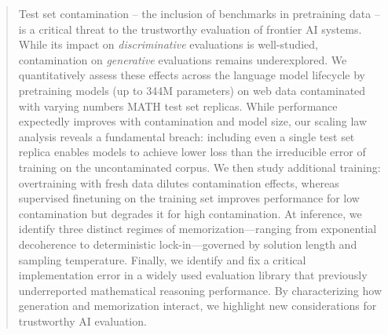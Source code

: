 \documentclass{article}
\theoremstyle{plain}
\theoremstyle{definition}
\theoremstyle{remark}
\begin{document}
\newcommand{\stella}[1]{%
  \textcolor{blue}{[\textbf{Stella:} #1] }}



\printAffiliationsAndNotice{}  %

\begin{abstract}
    Test set contamination -- the inclusion of benchmarks in pretraining data -- is a critical threat to the trustworthy evaluation of frontier AI systems.
    While its impact on \emph{discriminative} evaluations is well-studied, contamination on \emph{generative} evaluations remains underexplored.
    We quantitatively assess these effects across the language model lifecycle by pretraining models (up to 344M parameters) on web data contaminated with varying numbers MATH test set replicas.
    While performance expectedly improves with contamination and model size, our scaling law analysis reveals a fundamental breach: including even a single test set replica enables models to achieve lower loss than the irreducible error of training on the uncontaminated corpus.
    We then study additional training: overtraining with fresh data dilutes contamination effects, whereas supervised finetuning on the training set improves performance for low contamination but degrades it for high contamination.
    At inference, we identify three distinct regimes of memorization—ranging from exponential decoherence to deterministic lock-in—governed by solution length and sampling temperature.
    Finally, we identify and fix a critical implementation error in a widely used evaluation library that previously underreported mathematical reasoning performance. By characterizing how generation and memorization interact, we highlight new considerations for trustworthy AI evaluation.
\end{abstract}









\clearpage






\clearpage
\appendix
\onecolumn

\end{document}

